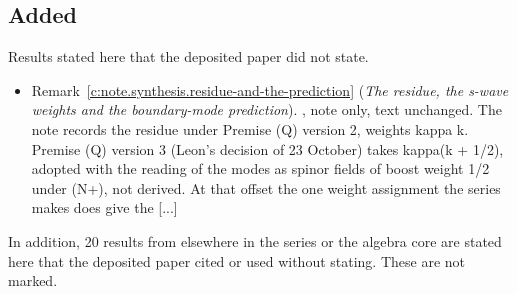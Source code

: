 \documentclass[11pt]{article}
\theoremstyle{definition}
\theoremstyle{plain}
\begin{document}
\subsection*{Added}
Results stated here that the deposited paper did not state.
\begin{itemize}\setlength{\itemsep}{2pt}
\item Remark~\ref{c:note.synthesis.residue-and-the-prediction} (\emph{The residue, the s-wave weights and the boundary-mode prediction}). , note only, text unchanged. The note records the residue under Premise (Q) version 2, weights kappa k. Premise (Q) version 3 (Leon's decision of 23 October) takes kappa(k + 1/2), adopted with the reading of the modes as spinor fields of boost weight 1/2 under (N+), not derived. At that offset the one weight assignment the series makes does give the [...]
\end{itemize}
\noindent In addition, 20 results from elsewhere in the series or the algebra core are stated here that the deposited paper cited or used without stating. These are not marked.
\end{document}
